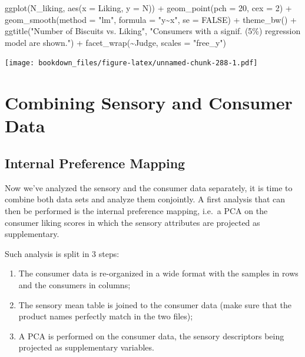 \documentclass[
]{krantz}
\makeatletter
\newenvironment{Shaded}{\begin{snugshade}}{\end{snugshade}}
\newcommand{\AttributeTok}[1]{\textcolor[rgb]{0.61,0.61,0.61}{#1}}
\newcommand{\ConstantTok}[1]{\textcolor[rgb]{0,0,0}{#1}}
\newcommand{\DecValTok}[1]{\textcolor[rgb]{0.06,0.06,0.06}{#1}}
\newcommand{\FunctionTok}[1]{\textcolor[rgb]{0,0,0}{#1}}
\newcommand{\NormalTok}[1]{#1}
\newcommand{\SpecialCharTok}[1]{\textcolor[rgb]{0,0,0}{#1}}
\newcommand{\StringTok}[1]{\textcolor[rgb]{0.5,0.5,0.5}{#1}}
\providecommand{\tightlist}{%
  \setlength{\itemsep}{0pt}\setlength{\parskip}{0pt}}
\newenvironment{kframe}{%
\medskip{}
\setlength{\fboxsep}{.8em}
 \def\at@end@of@kframe{}%
 \ifinner\ifhmode%
  \def\at@end@of@kframe{\end{minipage}}%
  \begin{minipage}{\columnwidth}%
 \fi\fi%
 \def\FrameCommand##1{\hskip\@totalleftmargin \hskip-\fboxsep
 \colorbox{shadecolor}{##1}\hskip-\fboxsep
     \hskip-\linewidth \hskip-\@totalleftmargin \hskip\columnwidth}%
 \MakeFramed {\advance\hsize-\width
   \@totalleftmargin\z@ \linewidth\hsize
   \@setminipage}}%
 {\par\unskip\endMakeFramed%
 \at@end@of@kframe}
\renewenvironment{Shaded}{\begin{kframe}}{\end{kframe}}
\makeatother
\begin{document}
\begin{Shaded}
\begin{Highlighting}[]
\FunctionTok{ggplot}\NormalTok{(N\_liking, }\FunctionTok{aes}\NormalTok{(}\AttributeTok{x =}\NormalTok{ Liking, }\AttributeTok{y =}\NormalTok{ N)) }\SpecialCharTok{+}
  \FunctionTok{geom\_point}\NormalTok{(}\AttributeTok{pch =} \DecValTok{20}\NormalTok{, }\AttributeTok{cex =} \DecValTok{2}\NormalTok{) }\SpecialCharTok{+}
  \FunctionTok{geom\_smooth}\NormalTok{(}\AttributeTok{method =} \StringTok{"lm"}\NormalTok{, }\AttributeTok{formula =} \StringTok{"y\textasciitilde{}x"}\NormalTok{, }\AttributeTok{se =} \ConstantTok{FALSE}\NormalTok{) }\SpecialCharTok{+}
  \FunctionTok{theme\_bw}\NormalTok{() }\SpecialCharTok{+}
  \FunctionTok{ggtitle}\NormalTok{(}\StringTok{"Number of Biscuits vs. Liking"}\NormalTok{, }
          \StringTok{"Consumers with a signif. (5\%) regression model are shown."}\NormalTok{) }\SpecialCharTok{+}
  \FunctionTok{facet\_wrap}\NormalTok{(}\SpecialCharTok{\textasciitilde{}}\NormalTok{Judge, }\AttributeTok{scales =} \StringTok{"free\_y"}\NormalTok{)}
\end{Highlighting}
\end{Shaded}

\texttt{[image: bookdown\_files/figure-latex/unnamed-chunk-288-1.pdf]}

\hypertarget{combining-sensory-and-consumer-data}{%
\section{Combining Sensory and Consumer Data}\label{combining-sensory-and-consumer-data}}

\hypertarget{internal-preference-mapping}{%
\subsection{Internal Preference Mapping}\label{internal-preference-mapping}}

Now we've analyzed the sensory and the consumer data separately, it is time to combine both data sets and analyze them conjointly. A first analysis that can then be performed is the internal preference mapping, i.e.~a PCA on the consumer liking scores in which the sensory attributes are projected as supplementary.

Such analysis is split in 3 steps:

\begin{enumerate}
\def\labelenumi{\arabic{enumi}.}
\tightlist
\item
  The consumer data is re-organized in a wide format with the samples in rows and the consumers in columns;
\item
  The sensory mean table is joined to the consumer data (make sure that the product names perfectly match in the two files);
\item
  A PCA is performed on the consumer data, the sensory descriptors being projected as supplementary variables.
\end{enumerate}
\end{document}
